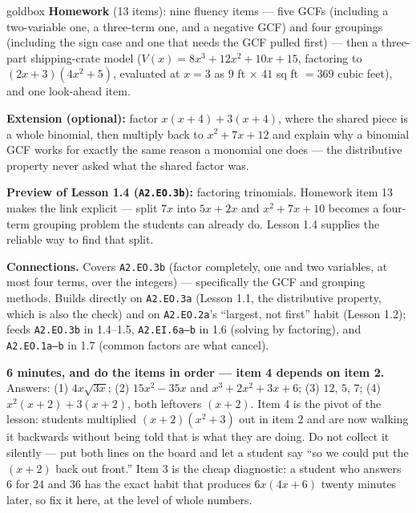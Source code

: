 \documentclass[10pt]{article}
\begin{document}
\boxguard[18]
\begin{skillbox}{goldbox}
\textbf{Homework} (13 items): nine fluency items --- five GCFs (including a two-variable one, a
three-term one, and a negative GCF) and four groupings (including the sign case and one that needs
the GCF pulled first) --- then a three-part shipping-crate model
($V(x)=8x^3+12x^2+10x+15$, factoring to $(2x+3)\left(4x^2+5\right)$, evaluated at $x=3$ as $9$ ft
$\times$ $41$ sq ft $=369$ cubic feet), and one look-ahead item.

\textbf{Extension (optional):} factor $x(x+4)+3(x+4)$, where the shared piece is a whole binomial,
then multiply back to $x^2+7x+12$ and explain why a binomial GCF works for exactly the same reason
a monomial one does --- the distributive property never asked what the shared factor was.

\textbf{Preview of Lesson 1.4 (\texttt{A2.EO.3b}):} factoring trinomials. Homework item 13 makes the
link explicit --- split $7x$ into $5x+2x$ and $x^2+7x+10$ becomes a four-term grouping problem the
students can already do. Lesson 1.4 supplies the reliable way to find that split.

\textbf{Connections.} Covers \texttt{A2.EO.3b} (factor completely, one and two variables, at most
four terms, over the integers) --- specifically the GCF and grouping methods. Builds directly on
\texttt{A2.EO.3a} (Lesson 1.1, the distributive property, which is also the check) and on
\texttt{A2.EO.2a}'s ``largest, not first'' habit (Lesson 1.2); feeds \texttt{A2.EO.3b} in 1.4--1.5,
\texttt{A2.EI.6a--b} in 1.6 (solving by factoring), and \texttt{A2.EO.1a--b} in 1.7 (common factors
are what cancel).
\end{skillbox}

\begin{teachernote}[Warm-Up]
    \textbf{6 minutes, and do the items in order --- item 4 depends on item 2.} Answers:
    (1) $4x\sqrt{3x}$; (2) $15x^2-35x$ and $x^3+2x^2+3x+6$; (3) $12$, $5$, $7$;
    (4) $x^2(x+2)+3(x+2)$, both leftovers $(x+2)$. Item 4 is the pivot of the lesson: students
    multiplied $(x+2)\left(x^2+3\right)$ out in item 2 and are now walking it backwards without
    being told that is what they are doing. Do not collect it silently --- put both lines on the
    board and let a student say ``so we could put the $(x+2)$ back out front.'' Item 3 is the
    cheap diagnostic: a student who answers $6$ for $24$ and $36$ has the exact habit that produces
    $6x(4x+6)$ twenty minutes later, so fix it here, at the level of whole numbers.
\end{teachernote}
\end{document}

